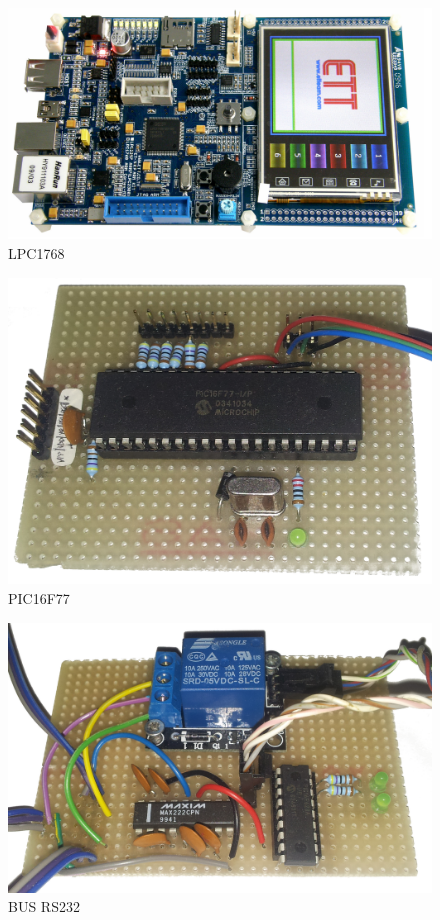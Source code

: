 \documentclass[a4paper,titlepage]{book}
\begin{document}
\begin{figure}[!ht]
\centering
\includegraphics[scale=1]{lpc1768.png}
\caption{LPC1768}
\end{figure}


\begin{figure}[!ht]
\centering
\includegraphics[scale=0.15]{pic16f77.png}
\caption{PIC16F77}
\end{figure}

\begin{figure}[!ht]
\centering
\includegraphics[scale=0.12]{bus_foto.png}
\caption{BUS RS232}
\end{figure}
\end{document}
